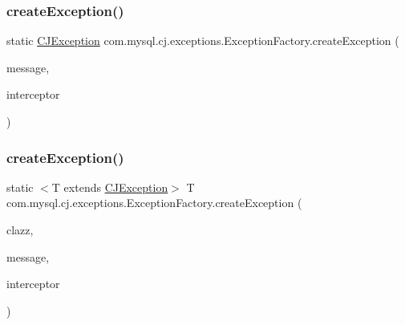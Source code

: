 \subsubsection{\texorpdfstring{create\+Exception()}{createException()}\hspace{0.1cm}{\footnotesize\ttfamily [3/9]}}
{\footnotesize\ttfamily static \mbox{\hyperlink{classcom_1_1mysql_1_1cj_1_1exceptions_1_1_c_j_exception}{C\+J\+Exception}} com.\+mysql.\+cj.\+exceptions.\+Exception\+Factory.\+create\+Exception (\begin{DoxyParamCaption}\item[{String}]{message,  }\item[{\mbox{\hyperlink{interfacecom_1_1mysql_1_1cj_1_1exceptions_1_1_exception_interceptor}{Exception\+Interceptor}}}]{interceptor }\end{DoxyParamCaption})\hspace{0.3cm}{\ttfamily [static]}}

\mbox{\label{classcom_1_1mysql_1_1cj_1_1exceptions_1_1_exception_factory_a9fb33af1ff5bf7216c592339f88a3f46}} 
\subsubsection{\texorpdfstring{create\+Exception()}{createException()}\hspace{0.1cm}{\footnotesize\ttfamily [4/9]}}
{\footnotesize\ttfamily static $<$T extends \mbox{\hyperlink{classcom_1_1mysql_1_1cj_1_1exceptions_1_1_c_j_exception}{C\+J\+Exception}}$>$ T com.\+mysql.\+cj.\+exceptions.\+Exception\+Factory.\+create\+Exception (\begin{DoxyParamCaption}\item[{Class$<$ T $>$}]{clazz,  }\item[{String}]{message,  }\item[{\mbox{\hyperlink{interfacecom_1_1mysql_1_1cj_1_1exceptions_1_1_exception_interceptor}{Exception\+Interceptor}}}]{interceptor }\end{DoxyParamCaption})\hspace{0.3cm}{\ttfamily [static]}}


